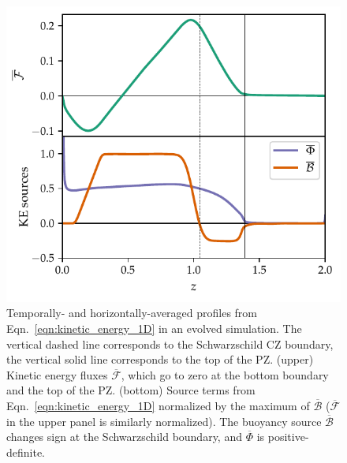 \documentclass[twocolumn]{aastex631}
\renewcommand{\bar}[1]{\overline{#1}}
\begin{document}
\begin{figure}[t!]
\centering
\includegraphics[width=\columnwidth]{theory_profiles.pdf}
\caption{
Temporally- and horizontally-averaged profiles from Eqn.~\ref{eqn:kinetic_energy_1D} in an evolved simulation.
The vertical dashed line corresponds to the Schwarzschild CZ boundary, the vertical solid line corresponds to the top of the PZ.
(upper) Kinetic energy fluxes $\bar{\mathcal{F}}$, which go to zero at the bottom boundary and the top of the PZ.
(bottom) Source terms from Eqn.~\ref{eqn:kinetic_energy_1D} normalized by the maximum of $\overline{\mathcal{B}}$ ($\bar{\mathcal{F}}$ in the upper panel is similarly normalized).
The buoyancy source $\bar{\mathcal{B}}$ changes sign at the Schwarzschild boundary, and $\bar{\Phi}$ is positive-definite.
\label{fig:theory_profiles}
}
\end{figure}
\end{document}
